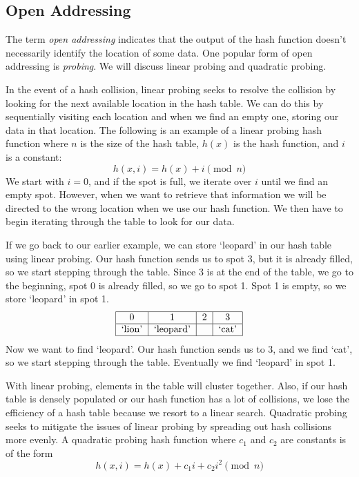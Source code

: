 \subsection*{Open Addressing}
The term \emph{open addressing} indicates that the output of the hash function doesn't necessarily identify the location of some data.
One popular form of open addressing is \emph{probing}.
We will discuss linear probing and quadratic probing.

In the event of a hash collision, linear probing seeks to resolve the collision by looking for the next available location in the hash table.
We can do this by sequentially visiting each location and when we find an empty one, storing our data in that location.
The following is an example of a linear probing hash function where $n$ is the size of the hash table, $h(x)$ is the hash function, and $i$ is a constant:
\begin{equation*}
h(x, i) = h(x) + i \pmod{n}
\end{equation*}
We start with $i = 0$, and if the spot is full, we iterate over $i$ until we find an empty spot.
However, when we want to retrieve that information we will be directed to the wrong location when we use our hash function.
We then have to begin iterating through the table to look for our data.

If we go back to our earlier example, we can store `leopard' in our hash table using linear probing.
Our hash function sends us to spot 3, but it is already filled, so we start stepping through the table.
Since 3 is at the end of the table, we go to the beginning, spot 0 is already filled, so we go to spot 1.
Spot 1 is empty, so we store `leopard' in spot 1.
\[
\begin{tabular}{|c|c|c|c|}
\hline
0 & 1 & 2 & 3\\
\hline
`lion' & `leopard' & & `cat' \\
\hline
\end{tabular}
\]
Now we want to find `leopard'.
Our hash function sends us to 3, and we find `cat', so we start stepping through the table.
Eventually we find `leopard' in spot 1.


With linear probing, elements in the table will cluster together.
Also, if our hash table is densely populated or our hash function has a lot of collisions,
 we lose the efficiency of a hash table because we resort to a linear search.
Quadratic probing seeks to mitigate the issues of linear probing by spreading out hash collisions more evenly.
A quadratic probing hash function where $c_1$ and $c_2$ are constants is of the form
\begin{equation*}
h(x, i) = h(x) + c_1i + c_2i^2 \pmod{n}
\end{equation*}


